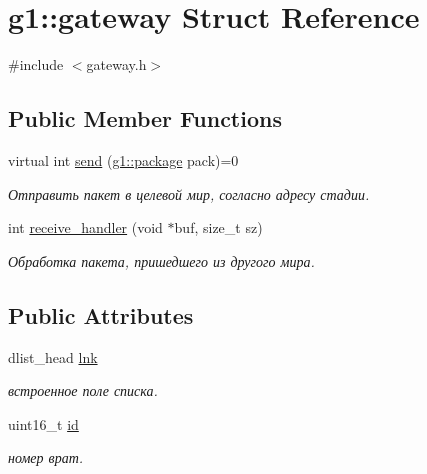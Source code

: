 \hypertarget{structg1_1_1gateway}{}\section{g1\+:\+:gateway Struct Reference}
\label{structg1_1_1gateway}


{\ttfamily \#include $<$gateway.\+h$>$}

\subsection*{Public Member Functions}
\begin{DoxyCompactItemize}
\item 
virtual int \hyperlink{structg1_1_1gateway_a73ffda2f32b50767a31a4a29cef408d3}{send} (\hyperlink{structg1_1_1package}{g1\+::package} pack)=0
\begin{DoxyCompactList}\small\item\em Отправить пакет в целевой мир, согласно адресу стадии. \end{DoxyCompactList}\item 
int \hyperlink{structg1_1_1gateway_a8554ef0120b9fbb279087eb1d8c205dd}{receive\+\_\+handler} (void $\ast$buf, size\+\_\+t sz)
\begin{DoxyCompactList}\small\item\em Обработка пакета, пришедшего из другого мира. \end{DoxyCompactList}\end{DoxyCompactItemize}
\subsection*{Public Attributes}
\begin{DoxyCompactItemize}
\item 
dlist\+\_\+head \hyperlink{structg1_1_1gateway_a9b30f9f8c97681eb9b8ce01594200916}{lnk}\hypertarget{structg1_1_1gateway_a9b30f9f8c97681eb9b8ce01594200916}{}\label{structg1_1_1gateway_a9b30f9f8c97681eb9b8ce01594200916}

\begin{DoxyCompactList}\small\item\em встроенное поле списка. \end{DoxyCompactList}\item 
uint16\+\_\+t \hyperlink{structg1_1_1gateway_a9bc58cdaebf54c916deb87c4c44c0a59}{id}\hypertarget{structg1_1_1gateway_a9bc58cdaebf54c916deb87c4c44c0a59}{}\label{structg1_1_1gateway_a9bc58cdaebf54c916deb87c4c44c0a59}

\begin{DoxyCompactList}\small\item\em номер врат. \end{DoxyCompactList}\end{DoxyCompactItemize}


